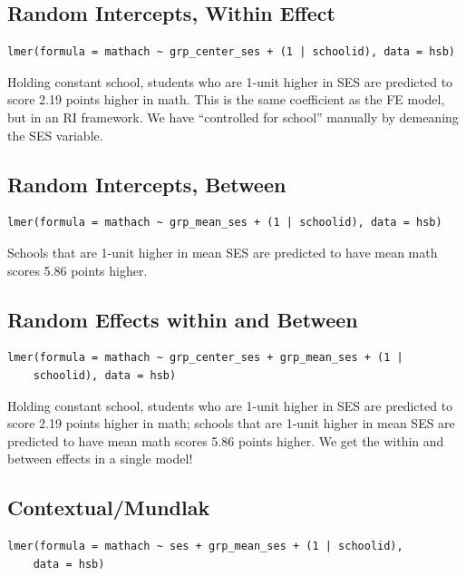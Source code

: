 \documentclass[
  letterpaper,
  DIV=11,
  numbers=noendperiod]{scrreprt}
\begin{document}
\subsection{Random Intercepts, Within
Effect}\label{random-intercepts-within-effect}

\begin{verbatim}
lmer(formula = mathach ~ grp_center_ses + (1 | schoolid), data = hsb)
\end{verbatim}

Holding constant school, students who are 1-unit higher in SES are
predicted to score 2.19 points higher in math. This is the same
coefficient as the FE model, but in an RI framework. We have
``controlled for school'' manually by demeaning the SES variable.

\subsection{Random Intercepts, Between}\label{random-intercepts-between}

\begin{verbatim}
lmer(formula = mathach ~ grp_mean_ses + (1 | schoolid), data = hsb)
\end{verbatim}

Schools that are 1-unit higher in mean SES are predicted to have mean
math scores 5.86 points higher.

\subsection{Random Effects within and
Between}\label{random-effects-within-and-between}

\begin{verbatim}
lmer(formula = mathach ~ grp_center_ses + grp_mean_ses + (1 | 
    schoolid), data = hsb)
\end{verbatim}

Holding constant school, students who are 1-unit higher in SES are
predicted to score 2.19 points higher in math; schools that are 1-unit
higher in mean SES are predicted to have mean math scores 5.86 points
higher. We get the within and between effects in a single model!

\subsection{Contextual/Mundlak}\label{contextualmundlak}

\begin{verbatim}
lmer(formula = mathach ~ ses + grp_mean_ses + (1 | schoolid), 
    data = hsb)
\end{verbatim}
\end{document}
